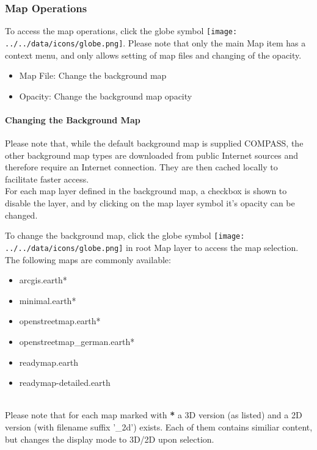 \subsubsection{Map Operations}
\label{ref:geoview_map_ops}

To access the map operations, click the globe symbol \texttt{[image: ../../data/icons/globe.png]}. Please note that only the main Map item has a context menu, and only allows setting of map files and changing of the opacity.

\begin{itemize}
 \item Map File: Change the background map
 \item Opacity: Change the background map opacity
\end{itemize} 

\paragraph{Changing the Background Map}

Please note that, while the default background map is supplied COMPASS, the other background map types are downloaded from public Internet sources and therefore require an Internet connection. They are then cached locally to facilitate faster access. \\

For each map layer defined in the background map, a checkbox is shown to disable the layer, and by clicking on the map layer symbol it's opacity can be changed.

To change the background map, click the globe symbol \texttt{[image: ../../data/icons/globe.png]} in root Map layer to access the map selection. \\

The following maps are commonly available:

\begin{itemize}
 \item arcgis.earth*
 \item minimal.earth*
 \item openstreetmap.earth*
 \item openstreetmap\_german.earth*
 \item readymap.earth
 \item readymap-detailed.earth
\end{itemize}
 \ \\
 
 Please note that for each map marked with \textbf{*} a 3D version (as listed) and a 2D version (with filename suffix '\_2d') exists. Each of them contains similiar content, but changes the display mode to 3D/2D upon selection. \\

